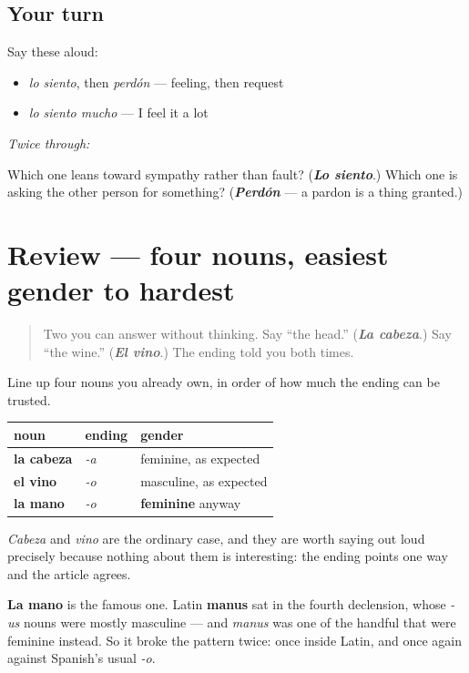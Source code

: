 \subsection*{Your turn}
Say these aloud:

\begin{itemize}
\raggedright
  \item \emph{lo siento}, then \emph{perdón} — feeling, then request
  \item \emph{lo siento mucho} — I feel it a lot
\end{itemize}

\emph{Twice through:}

\begin{tcolorbox}[breakable,colback=teal!4,colframe=teal!35!black,title={Before you move on}]
Which one leans toward sympathy rather than fault? (\emph{\textbf{Lo siento}}.) Which one is asking the other person for something? (\emph{\textbf{Perdón}} — a pardon is a thing granted.)
\end{tcolorbox}
\section[(review)]{Review — four nouns, easiest gender to hardest}

\label{lesson:ES-C318-repaso-genero}



\begin{quote}
Two you can answer without thinking. Say \textquotedblleft{}the head.\textquotedblright{} (\emph{\textbf{La cabeza}}.) Say \textquotedblleft{}the wine.\textquotedblright{} (\emph{\textbf{El vino}}.) The ending told you both times.
\end{quote}

\begin{grammarlens}[title={What you've built}]
Line up four nouns you already own, in order of how much the ending can be trusted.

\noindent
\begin{tabularx}{\linewidth}{@{}>{\raggedright\arraybackslash}X>{\raggedright\arraybackslash}X>{\raggedright\arraybackslash}X@{}}
\toprule
\textbf{noun} & \textbf{ending} & \textbf{gender} \\
\midrule
\textbf{la cabeza} & \emph{-a} & feminine, as expected \\
\textbf{el vino} & \emph{-o} & masculine, as expected \\
\textbf{la mano} & \emph{-o} & \textbf{feminine} anyway \\
\bottomrule
\end{tabularx}

\emph{Cabeza} and \emph{vino} are the ordinary case, and they are worth saying out loud precisely because nothing about them is interesting: the ending points one way and the article agrees.

\textbf{La mano} is the famous one. Latin \textbf{manus} sat in the fourth declension, whose \emph{-us} nouns were mostly masculine — and \emph{manus} was one of the handful that were feminine instead. So it broke the pattern twice: once inside Latin, and once again against Spanish's usual \emph{-o}.
\end{grammarlens}

